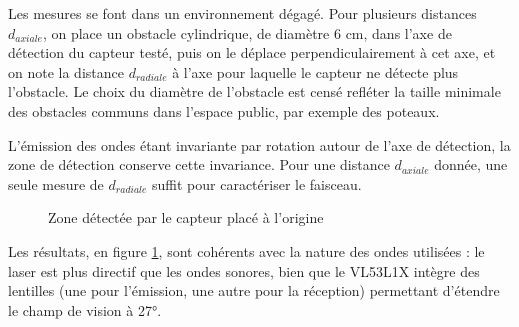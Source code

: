 \documentclass[a4paper, 11pt]{article}
\begin{document}
\par Les mesures se font dans un environnement dégagé. Pour plusieurs distances $d_{axiale}$, on place un obstacle cylindrique, de diamètre 6 cm, dans l'axe de détection du capteur testé, puis on le déplace perpendiculairement à cet axe, et on note la distance $d_{radiale}$ à l'axe pour laquelle le capteur ne détecte plus l'obstacle. Le choix du diamètre de l'obstacle est censé refléter la taille minimale des obstacles communs dans l'espace public, par exemple des poteaux.

\par L'émission des ondes étant invariante par rotation autour de l'axe de détection, la zone de détection conserve cette invariance. Pour une distance $d_{axiale}$ donnée, une seule mesure de $d_{radiale}$ suffit pour caractériser le faisceau.

\begin{figure}[H]
\centering
{}
\caption{Zone détectée par le capteur placé à l'origine}
\label{faisceau}
\end{figure}

\par Les résultats, en figure \ref{faisceau}, sont cohérents avec la nature des ondes utilisées : le laser est plus directif que les ondes sonores, bien que le VL53L1X intègre des lentilles (une pour l'émission, une autre pour la réception) permettant d'étendre le champ de vision à 27°.
\end{document}
